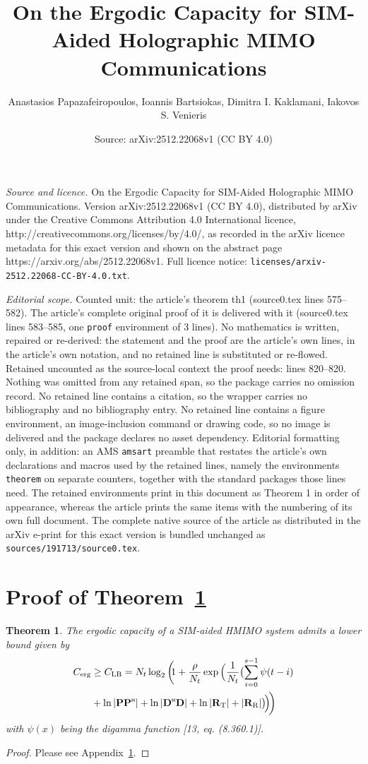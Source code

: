 \documentclass[10pt,a4paper]{amsart}
\title{On the Ergodic Capacity for SIM-Aided Holographic MIMO Communications}
\author{Anastasios Papazafeiropoulos, Ioannis Bartsiokas, Dimitra I. Kaklamani, Iakovos S. Venieris}
\date{Source: arXiv:2512.22068v1 (CC BY 4.0)}
\newtheorem{theorem}{Theorem}
\renewcommand{\H}{{\scriptscriptstyle\mathsf{H}}}
\def\bD{{\mathbf{D}}}
\def\bP{{\mathbf{P}}}
\def\bR{{\mathbf{R}}}
\def\nn{\nonumber}
\begin{document}
\maketitle

\noindent\emph{Source and licence.} On the Ergodic Capacity for SIM-Aided Holographic MIMO Communications. Version arXiv:2512.22068v1 (CC BY 4.0), distributed by arXiv under the Creative Commons Attribution 4.0 International licence, http://creativecommons.org/licenses/by/4.0/, as recorded in the arXiv licence metadata for this exact version and shown on the abstract page https://arxiv.org/abs/2512.22068v1. Full licence notice: \texttt{licenses/arxiv-2512.22068-CC-BY-4.0.txt}.\par\smallskip

\noindent\textit{Editorial scope.} Counted unit: the article's theorem th1 (source0.tex lines 575--582). The article's complete original proof of it is delivered with it (source0.tex lines 583--585, one \texttt{proof} environment of 3 lines). No mathematics is written, repaired or re-derived: the statement and the proof are the article's own lines, in the article's own notation, and no retained line is substituted or re-flowed.  Retained uncounted as the source-local context the proof needs: lines 820--820.  Nothing was omitted from any retained span, so the package carries no omission record.  No retained line contains a citation, so the wrapper carries no bibliography and no bibliography entry.  No retained line contains a figure environment, an image-inclusion command or drawing code, so no image is delivered and the package declares no asset dependency.  Editorial formatting only, in addition: an AMS \texttt{amsart} preamble that restates the article's own declarations and macros used by the retained lines, namely the environments \texttt{theorem} on separate counters, together with the standard packages those lines need.  The retained environments print in this document as Theorem 1 in order of appearance, whereas the article prints the same items with the numbering of its own full document.  The complete native source of the article as distributed in the arXiv e-print for this exact version is bundled unchanged as \texttt{sources/191713/source0.tex}.
		\section{Proof of Theorem~\ref{th1}}\label{th1proof}	

	\begin{theorem}\label{th1}
	The ergodic capacity of a  SIM-aided HMIMO system admits a lower bound given by
		\begin{align}
			C_{\mathrm{erg}}&\ge 	C_{\mathrm{LB}}=N_{t} \log_{2}\bigg(\!\!1+\frac{\rho}{N_{t}} \exp \Big(\frac{1}{N_{t}}\big(\textcolor{black}{\sum_{i=0}^{s-1}\psi(t-i)}\nn\\
			&+\ln |\bP\bP^{\H}|+\ln |\bD^{\H}\bD|+\ln |\bR_{\mathrm{T}}|+|\bR_{\mathrm{R}}|\big)\!\Big)\!\bigg)\label{capacity0}
		\end{align}
		with $\psi(x)$ being the digamma function [13, eq. (8.360.1)].
	\end{theorem}

	\begin{proof}
		Please see Appendix~\ref{th1proof}.	
	\end{proof}
\end{document}
